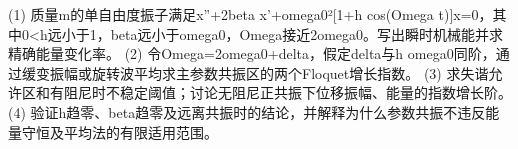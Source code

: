 (1) 质量m的单自由度振子满足x''+2beta x'+omega0²[1+h cos(Omega t)]x=0，其中0<h远小于1，beta远小于omega0，Omega接近2omega0。写出瞬时机械能并求精确能量变化率。
(2) 令Omega=2omega0+delta，假定delta与h omega0同阶，通过缓变振幅或旋转波平均求主参数共振区的两个Floquet增长指数。
(3) 求失谐允许区和有阻尼时不稳定阈值；讨论无阻尼正共振下位移振幅、能量的指数增长阶。
(4) 验证h趋零、beta趋零及远离共振时的结论，并解释为什么参数共振不违反能量守恒及平均法的有限适用范围。

